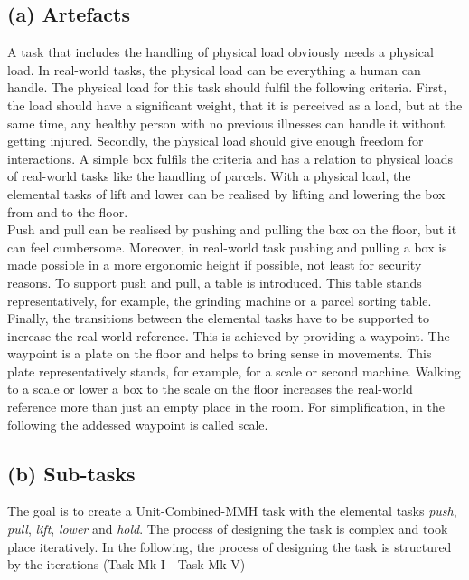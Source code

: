 \subsection{(a) Artefacts}
A task that includes the handling of physical load obviously needs a physical load. In real-world tasks, the physical load can be everything a human can handle. The physical load for this task should fulfil the following criteria. First, the load should have a significant weight, that it is perceived as a load, but at the same time, any healthy person with no previous illnesses can handle it without getting injured. Secondly, the physical load should give enough freedom for interactions. A simple box fulfils the criteria and has a relation to physical loads of real-world tasks like the handling of parcels. With a physical load, the elemental tasks of lift and lower can be realised by lifting and lowering the box from and to the floor.\\
Push and pull can be realised by pushing and pulling the box on the floor, but it can feel cumbersome. Moreover, in real-world task pushing and pulling a box is made possible in a more ergonomic height if possible, not least for security reasons. To support push and pull, a table is introduced. This table stands representatively, for example, the grinding machine or a parcel sorting table.\\
Finally, the transitions between the elemental tasks have to be supported to increase the real-world reference. This is achieved by providing a waypoint. The waypoint is a plate on the floor and helps to bring sense in movements. This plate representatively stands, for example, for a scale or second machine. Walking to a scale or lower a box to the scale on the floor increases the real-world reference more than just an empty place in the room. For simplification, in the following the addessed waypoint is called scale.

\subsection{(b) Sub-tasks}
\label{sec:subTasks}
The goal is to create a Unit-Combined-MMH task with the elemental tasks \textit{push}, \textit{pull}, \textit{lift}, \textit{lower} and \textit{hold}. The process of designing the task is complex and took place iteratively. In the following, the process of designing the task is structured by the iterations (Task Mk I - Task Mk V)\\

